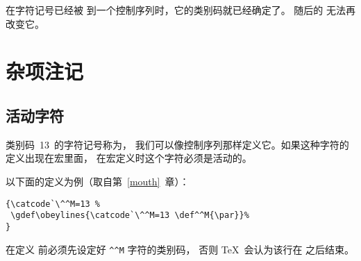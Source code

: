 \documentclass[letterpaper]{book}
\begin{document}
在字符记号已经被  到一个控制序列时，它的类别码就已经确定了。
随后的  无法再改变它。

\section{杂项注记}

\subsection{活动字符}

类别码~13~的字符记号称为，
我们可以像控制序列那样定义它。如果这种字符的定义出现在宏里面，
在宏定义时这个字符必须是活动的。

以下面的定义为例（取自第~\ref{mouth}~章）：
\begin{verbatim}
{\catcode`\^^M=13 %
 \gdef\obeylines{\catcode`\^^M=13 \def^^M{\par}}%
}
\end{verbatim}
在定义  前必须先设定好 \verb>^^M> 字符的类别码，
否则 \TeX\ 会认为该行在  之后结束。
\end{document}
